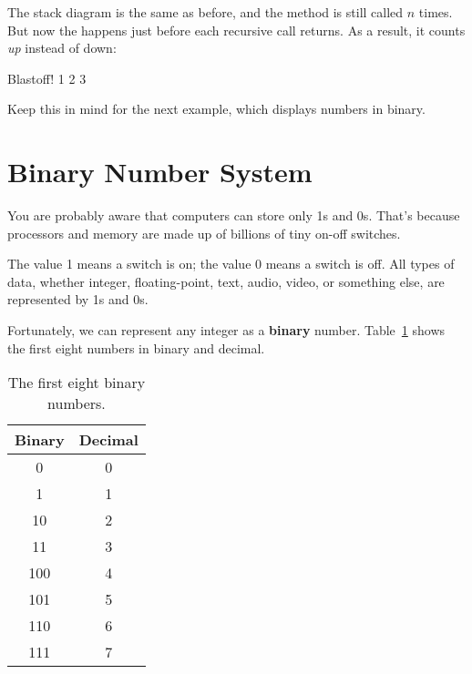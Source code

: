 The stack diagram is the same as before, and the method is still called $n$ times.
But now the  happens just before each recursive call returns.
As a result, it counts {\em up} instead of down:

\begin{stdout}
Blastoff!
1
2
3
\end{stdout}

Keep this in mind for the next example, which displays numbers in binary.

\section{Binary Number System}
\label{binary}

You are probably aware that computers can store only 1s and 0s.
That's because processors and memory are made up of billions of tiny on-off switches.

The value 1 means a switch is on; the value 0 means a switch is off.
All types of data, whether integer, floating-point, text, audio, video, or something else, are represented by 1s and 0s.


Fortunately, we can represent any integer as a {\bf binary} number.
Table~\ref{tab:binary} shows the first eight numbers in binary and decimal.

\begin{table}[!ht]
\begin{center}
\begin{tabular}{|c|c|}
\hline
Binary & Decimal \\
\hline
0 & 0 \\
\hline
1 & 1 \\
\hline
10 & 2 \\
\hline
11 & 3 \\
\hline
100 & 4 \\
\hline
101 & 5 \\
\hline
110 & 6 \\
\hline
111 & 7 \\
\hline
\end{tabular}
\caption{The first eight binary numbers.}
\label{tab:binary}
\end{center}
\end{table}


